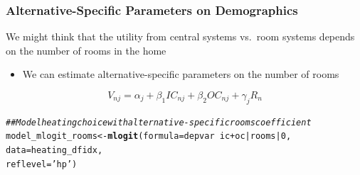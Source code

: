 \documentclass{beamer}\usepackage[]{graphicx}\usepackage[]{color}
\makeatletter
\newcommand{\hlnum}[1]{\textcolor[rgb]{0.686,0.059,0.569}{#1}}%
\newcommand{\hlstr}[1]{\textcolor[rgb]{0.192,0.494,0.8}{#1}}%
\newcommand{\hlcom}[1]{\textcolor[rgb]{0.678,0.584,0.686}{\textit{#1}}}%
\newcommand{\hlopt}[1]{\textcolor[rgb]{0,0,0}{#1}}%
\newcommand{\hlstd}[1]{\textcolor[rgb]{0.345,0.345,0.345}{#1}}%
\newcommand{\hlkwb}[1]{\textcolor[rgb]{0.69,0.353,0.396}{#1}}%
\newcommand{\hlkwc}[1]{\textcolor[rgb]{0.333,0.667,0.333}{#1}}%
\newcommand{\hlkwd}[1]{\textcolor[rgb]{0.737,0.353,0.396}{\textbf{#1}}}%
\newenvironment{kframe}{%
 \def\at@end@of@kframe{}%
 \ifinner\ifhmode%
  \def\at@end@of@kframe{\end{minipage}}%
  \begin{minipage}{\columnwidth}%
 \fi\fi%
 \def\FrameCommand##1{\hskip\@totalleftmargin \hskip-\fboxsep
 \colorbox{shadecolor}{##1}\hskip-\fboxsep
     \hskip-\linewidth \hskip-\@totalleftmargin \hskip\columnwidth}%
 \MakeFramed {\advance\hsize-\width
   \@totalleftmargin\z@ \linewidth\hsize
   \@setminipage}}%
 {\par\unskip\endMakeFramed%
 \at@end@of@kframe}
\newenvironment{knitrout}{}{} %
\makeatother
\begin{document}
\begin{frame}[fragile]\frametitle{Alternative-Specific Parameters on Demographics}
	We might think that the utility from central systems vs.\ room systems depends on the number of rooms in the home
	\begin{itemize}
		\item We can estimate alternative-specific parameters on the number of rooms
	\end{itemize}
	$$V_{nj} = \alpha_j + \beta_1 IC_{nj} + \beta_2 OC_{nj} + \gamma_j R_{n}$$
\begin{knitrout}\footnotesize
{}\color{fgcolor}\begin{kframe}
\begin{alltt}
\hlcom{## Model heating choice with alternative-specific rooms coefficient}
\hlstd{model_mlogit_rooms} \hlkwb{<-} \hlkwd{mlogit}\hlstd{(}\hlkwc{formula} \hlstd{= depvar} \hlopt{~} \hlstd{ic} \hlopt{+} \hlstd{oc} \hlopt{|} \hlstd{rooms} \hlopt{|} \hlnum{0}\hlstd{,}
                             \hlkwc{data} \hlstd{= heating_dfidx,}
                             \hlkwc{reflevel} \hlstd{=} \hlstr{'hp'}\hlstd{)}
\end{alltt}
\end{kframe}
\end{knitrout}
\end{frame}
\end{document}

